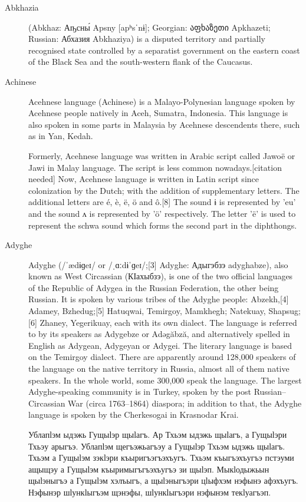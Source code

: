 
\begin{description}
\item[Abkhazia] (Abkhaz: Аҧсны́ Apsny [apʰsˈnɨ]; Georgian: აფხაზეთი Apkhazeti; Russian: Абхазия Abkhaziya) is a disputed territory and partially recognised state controlled by a separatist government on the eastern coast of the Black Sea and the south-western flank of the Caucasus.

\item[Achinese] Acehnese language (Achinese) is a Malayo-Polynesian language spoken by Acehnese people natively in Aceh, Sumatra, Indonesia. This language is also spoken in some parts in Malaysia by Acehnese descendents there, such as in Yan, Kedah.

Formerly, Acehnese language was written in Arabic script called Jawoë or Jawi in Malay language. The script is less common nowadays.[citation needed] Now, Acehnese language is written in Latin script since colonization by the Dutch; with the addition of supplementary letters. The additional letters are é, è, ë, ö and ô.[8] The sound ɨ is represented by 'eu' and the sound ʌ is represented by 'ö' respectively. The letter 'ë' is used to represent the schwa sound which forms the second part in the diphthongs.

\item[Adyghe] Adyghe (/ˈædɨɡeɪ/ or /ˌɑːdɨˈɡeɪ/;[3] Adyghe: Адыгэбзэ adyghabze), also known as West Circassian (КӀахыбзэ), is one of the two official languages of the Republic of Adygea in the Russian Federation, the other being Russian. It is spoken by various tribes of the Adyghe people: Abzekh,[4] Adamey, Bzhedug;[5] Hatuqwai, Temirgoy, Mamkhegh; Natekuay, Shapsug;[6] Zhaney, Yegerikuay, each with its own dialect. The language is referred to by its speakers as Adygebze or Adəgăbză, and alternatively spelled in English as Adygean, Adygeyan or Adygei. The literary language is based on the Temirgoy dialect.
There are apparently around 128,000 speakers of the language on the native territory in Russia, almost all of them native speakers. In the whole world, some 300,000 speak the language. The largest Adyghe-speaking community is in Turkey, spoken by the post Russian–Circassian War (circa 1763–1864) diaspora; in addition to that, the Adyghe language is spoken by the Cherkesogai in Krasnodar Krai.

Ублапӏэм ыдэжь Гущыӏэр щыӏагъ. Ар Тхьэм ыдэжь щыӏагъ, а Гущыӏэри Тхьэу арыгъэ. Ублапӏэм щегъэжьагъэу а Гущыӏэр Тхьэм ыдэжь щыӏагъ. Тхьэм а Гущыӏэм зэкӏэри къыригъэгъэхъугъ. Тхьэм къыгъэхъугъэ пстэуми ащыщэу а Гущыӏэм къыримыгъгъэхъугъэ зи щыӏэп. Мыкӏодыжьын щыӏэныгъэ а Гущыӏэм хэлъыгъ, а щыӏэныгъэри цӏыфхэм нэфынэ афэхъугъ. Нэфынэр шӏункӏыгъэм щэнэфы, шӏункӏыгъэри нэфынэм текӏуагъэп.


\end{description}
